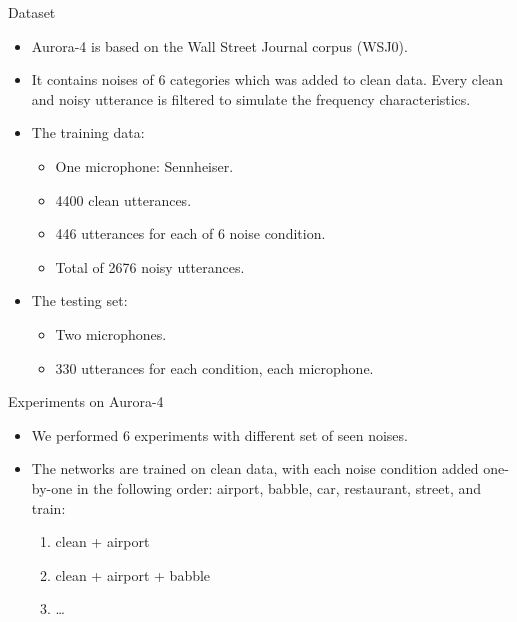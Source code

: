 \documentclass[final]{beamer}
\newlength{\onecolwid}
\newlength{\twocolwid}
\begin{document}
\begin{frame}[t]
\begin{columns}[t]
\begin{column}{\twocolwid}
\begin{columns}[t]
        \begin{column}{\onecolwid} %
            \begin{block}{\Large Dataset}
                \begin{itemize}
                    \item Aurora-4 is based on the Wall Street Journal corpus (WSJ0). 
                    \item It contains noises of 
                        6 categories which was added to clean data. Every clean and noisy utterance is 
                        filtered to simulate the frequency characteristics. 
                    \item The training data: 
                        \begin{itemize}
                            \item One microphone: Sennheiser.
                            \item 4400 clean utterances.
                            \item 446 utterances for each of 6 noise condition.
                            \item Total of 2676 noisy utterances.
                        \end{itemize}
                    \item The testing set:
                        \begin{itemize}
                            \item Two microphones.
                            \item 330 utterances for each condition, each microphone.
                        \end{itemize}
                \end{itemize}
            \end{block}

            \begin{block}{{\Large Experiments on Aurora-4}}
                \begin{itemize}
                    \item We performed 6 experiments with different set of seen noises. 
                    \item The networks are trained
                on clean data, with each noise condition added one-by-one in the following order: airport, babble, car, 
                restaurant, street, and train:
                    \begin{enumerate}
                        \item clean + airport
                        \item clean + airport + babble
                        \item \ldots
                    \end{enumerate}
                \end{itemize}


\end{block}
\end{column}
\end{columns}
\end{column}
\end{columns}
\end{frame}
\end{document}
